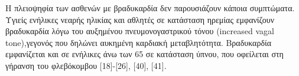 Η πλειοψηφία των ασθενών με βραδυκαρδία δεν παρουσιάζουν κάποια συμπτώματα. Υγιείς ενήλικες νεαρής ηλικίας και αθλητές σε κατάσταση ηρεμίας εμφανίζουν βραδυκαρδία λόγω του αυξημένου πνευμονογαστρικού τόνου (\en increased vagal tone),\gr γεγονός που δηλώνει αυκημένη καρδιακή μεταβλητότητα. Βραδυκαρδία εμφανίζεται και σε ενήλικες άνω των 65 σε κατάσταση ύπνου, που οφείλεται στη γήρανση του φλεβόκομβου [18]-[26], [40], [41]. 
\par

%
